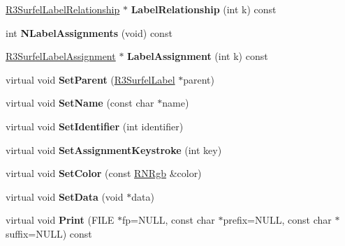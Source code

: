 \begin{DoxyCompactItemize}
\item 
\hyperlink{class_r3_surfel_label_relationship}{R3\+Surfel\+Label\+Relationship} $\ast$ {\bfseries Label\+Relationship} (int k) const \hypertarget{class_r3_surfel_label_a9fdc750ebf65a76ff1690c95c86ee854}{}\label{class_r3_surfel_label_a9fdc750ebf65a76ff1690c95c86ee854}

\item 
int {\bfseries N\+Label\+Assignments} (void) const \hypertarget{class_r3_surfel_label_ab628648be5697fbd398906c2392fa351}{}\label{class_r3_surfel_label_ab628648be5697fbd398906c2392fa351}

\item 
\hyperlink{class_r3_surfel_label_assignment}{R3\+Surfel\+Label\+Assignment} $\ast$ {\bfseries Label\+Assignment} (int k) const \hypertarget{class_r3_surfel_label_adb06010dbc857b4ac598f1c66ebc0ab3}{}\label{class_r3_surfel_label_adb06010dbc857b4ac598f1c66ebc0ab3}

\item 
virtual void {\bfseries Set\+Parent} (\hyperlink{class_r3_surfel_label}{R3\+Surfel\+Label} $\ast$parent)\hypertarget{class_r3_surfel_label_a468bf63d36d6876e42656c5e2f25afd5}{}\label{class_r3_surfel_label_a468bf63d36d6876e42656c5e2f25afd5}

\item 
virtual void {\bfseries Set\+Name} (const char $\ast$name)\hypertarget{class_r3_surfel_label_aa6e27993469dd0bbd3959e257660161c}{}\label{class_r3_surfel_label_aa6e27993469dd0bbd3959e257660161c}

\item 
virtual void {\bfseries Set\+Identifier} (int identifier)\hypertarget{class_r3_surfel_label_a4b017c5e52b5e514f3e13da9b8b3c9ce}{}\label{class_r3_surfel_label_a4b017c5e52b5e514f3e13da9b8b3c9ce}

\item 
virtual void {\bfseries Set\+Assignment\+Keystroke} (int key)\hypertarget{class_r3_surfel_label_adcaeda32d5a251d9bcc7e49d86ec8de3}{}\label{class_r3_surfel_label_adcaeda32d5a251d9bcc7e49d86ec8de3}

\item 
virtual void {\bfseries Set\+Color} (const \hyperlink{class_r_n_rgb}{R\+N\+Rgb} \&color)\hypertarget{class_r3_surfel_label_a65dcdd715f6f6b30debf3a2759e27ced}{}\label{class_r3_surfel_label_a65dcdd715f6f6b30debf3a2759e27ced}

\item 
virtual void {\bfseries Set\+Data} (void $\ast$data)\hypertarget{class_r3_surfel_label_a36f112be5442f762177412fa0e2391ec}{}\label{class_r3_surfel_label_a36f112be5442f762177412fa0e2391ec}

\item 
virtual void {\bfseries Print} (F\+I\+LE $\ast$fp=N\+U\+LL, const char $\ast$prefix=N\+U\+LL, const char $\ast$suffix=N\+U\+LL) const \hypertarget{class_r3_surfel_label_a6cd67d905552acc8a45fa07855efa96e}{}\label{class_r3_surfel_label_a6cd67d905552acc8a45fa07855efa96e}

\end{DoxyCompactItemize}
